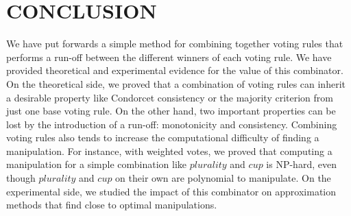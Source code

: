 \documentclass{ecai2012}
\begin{document}
\vspace{-1mm}
\section{CONCLUSION}

We have put forwards a simple method for combining together
voting rules that performs a run-off between
the different winners of each voting rule.
We have provided theoretical and experimental
evidence for the value of this combinator. On the
theoretical side, we proved that a combination
of voting rules can inherit a desirable property like
Condorcet consistency or the majority criterion
from just one base voting rule. On the other
hand, two important properties can be lost by the
introduction of a run-off: monotonicity and
consistency. Combining voting rules also
tends to increase the computational difficulty
of finding a manipulation. For instance,
with weighted votes, we proved that
computing a manipulation for a simple
combination like $plurality$ and $cup$
is NP-hard, even though
$plurality$ and $cup$ on their own
are polynomial to manipulate.
On the experimental side,
we studied the impact of this combinator
on approximation methods that
find close to optimal manipulations.



%
%
%
\end{document}
